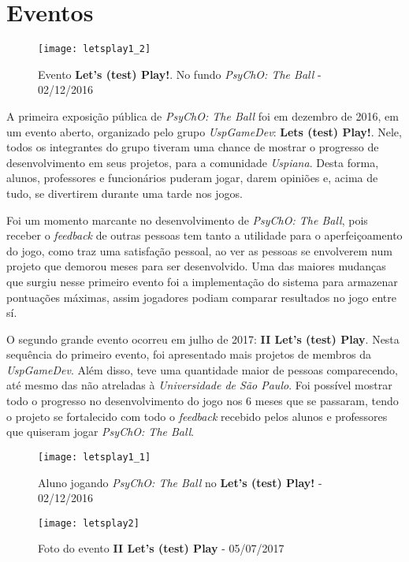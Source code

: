 \section{Eventos}
\label{sec:eventos}


\begin{figure}[h]
\texttt{[image: letsplay1\_2]}
\centering
\caption{Evento \textbf{Let's (test) Play!}. No fundo \textit{PsyChO: The Ball} - 02/12/2016}
\end{figure}

A primeira exposição pública de \textit{PsyChO: The Ball} foi em dezembro de 2016, em um evento aberto, organizado pelo grupo \textit{UspGameDev}: \textbf{Lets (test) Play!}. Nele, todos os integrantes do grupo tiveram uma chance de mostrar o progresso de desenvolvimento em seus projetos, para a comunidade \textit{Uspiana}. Desta forma, alunos, professores e funcionários puderam jogar, darem opiniões e, acima de tudo, se divertirem durante uma tarde nos jogos.

Foi um momento marcante no desenvolvimento de \textit{PsyChO: The Ball}, pois receber o \textit{feedback} de outras pessoas tem tanto a utilidade para o aperfeiçoamento do jogo, como traz uma satisfação pessoal, ao ver as pessoas se envolverem num projeto que demorou meses para ser desenvolvido. Uma das maiores mudanças que surgiu nesse primeiro evento foi a implementação do sistema para armazenar pontuações máximas, assim jogadores podiam comparar resultados no jogo entre sí.

O segundo grande evento ocorreu em julho de 2017: \textbf{II Let's (test) Play}. Nesta sequência do primeiro evento, foi apresentado mais projetos de membros da \textit{UspGameDev}. Além disso, teve uma quantidade maior de pessoas comparecendo, até mesmo das não atreladas à \textit{Universidade de São Paulo}. Foi possível mostrar todo o progresso no desenvolvimento do jogo nos 6 meses que se passaram, tendo o projeto se fortalecido com todo o \textit{feedback} recebido pelos alunos e professores que quiseram jogar \textit{PsyChO: The Ball}.

\begin{figure}[h!]
  \texttt{[image: letsplay1\_1]}
  \centering
  \caption{Aluno jogando \textit{PsyChO: The Ball} no \textbf{Let's (test) Play!} - 02/12/2016}
\end{figure}

\begin{figure}[h]
\texttt{[image: letsplay2]}
\centering
\caption{Foto do evento \textbf{II Let's (test) Play} - 05/07/2017}
\end{figure}

